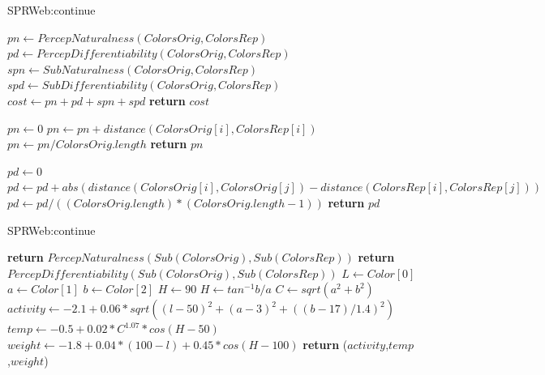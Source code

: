 \begin{algorithm}[!htb]
\caption{SPRWeb:continue}\label{SPRWeb:continue3}
\begin{algorithmic}[1]
\State $pn \gets PercepNaturalness(ColorsOrig,ColorsRep)$
\State $pd \gets PercepDifferentiability(ColorsOrig,ColorsRep)$
\State $spn \gets SubNaturalness(ColorsOrig,ColorsRep)$
\State $spd \gets SubDifferentiability(ColorsOrig,ColorsRep)$
\State $cost \gets pn + pd + spn + spd$
\State \textbf{return} $cost$
\EndProcedure

\State $pn \gets 0$
	\State $pn \gets pn + distance(ColorsOrig[i],ColorsRep[i])$
\EndFor
\State $pn \gets pn/ColorsOrig.length$
\State \textbf{return} $pn$
\EndProcedure

\State $pd \gets 0$
		\State $pd \gets pd + abs(distance(ColorsOrig[i],ColorsOrig[j]) - distance(ColorsRep[i],ColorsRep[j]))$
	\EndFor
\EndFor
\State $pd \gets pd/((ColorsOrig.length)*(ColorsOrig.length-1))$
\State \textbf{return} $pd$
\EndProcedure
{}
\end{algorithmic}
\end{algorithm}

\begin{algorithm}[!htb]
\caption{SPRWeb:continue}\label{SPRWeb:continue4}
\begin{algorithmic}[1]
\State \textbf{return} $PercepNaturalness(Sub(ColorsOrig),Sub(ColorsRep))$
\EndProcedure
{}
\State \textbf{return} $PercepDifferentiability(Sub(ColorsOrig),Sub(ColorsRep))$
\EndProcedure
{}   
\State $L \gets Color[0]$
\State $a \gets Color[1]$
\State $b \gets Color[2]$
	\State $H \gets 90$
\Else
	\State $H \gets tan^{-1}b/a$
\EndIf
\State $C \gets sqrt({a^{2}+b^{2}})$
\State $activity \gets -2.1 + 0.06*sqrt({(l-50)^{2}+(a-3)^{2}+((b-17)/1.4)^{2}})$
\State $temp\gets -0.5 + 0.02*C^{1.07}*cos(H-50)$
\State $weight\gets -1.8 + 0.04*(100-l) + 0.45*cos(H-100)$
\State \textbf{return} ($activity$,$temp$,$weight$)
\EndProcedure
\end{algorithmic}
\end{algorithm}



